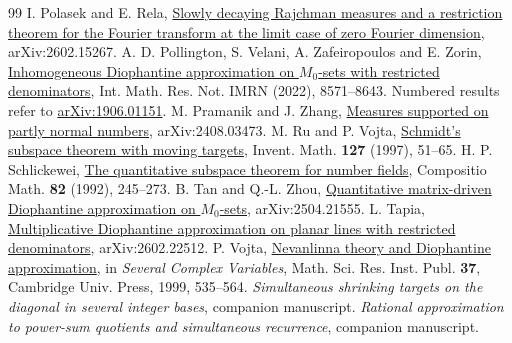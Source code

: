 \documentclass[11pt,a4paper,reqno]{amsart}
\theoremstyle{definition}
\theoremstyle{remark}
\numberwithin{equation}{section}
\begin{document}
\begin{thebibliography}{99}
 I. Polasek and E. Rela, \href{https://arxiv.org/abs/2602.15267}{Slowly decaying Rajchman measures and a restriction theorem for the Fourier transform at the limit case of zero Fourier dimension}, arXiv:2602.15267.
 A. D. Pollington, S. Velani, A. Zafeiropoulos and E. Zorin, \href{https://doi.org/10.1093/imrn/rnaa307}{Inhomogeneous Diophantine approximation on \(M_0\)-sets with restricted denominators}, Int. Math. Res. Not. IMRN (2022), 8571--8643. Numbered results refer to \href{https://arxiv.org/abs/1906.01151}{arXiv:1906.01151}.
 M. Pramanik and J. Zhang, \href{https://arxiv.org/abs/2408.03473}{Measures supported on partly normal numbers}, arXiv:2408.03473.
 M. Ru and P. Vojta, \href{https://doi.org/10.1007/s002220050114}{Schmidt's subspace theorem with moving targets}, Invent. Math. \textbf{127} (1997), 51--65.
 H. P. Schlickewei, \href{https://www.numdam.org/item/CM_1992__82_3_245_0/}{The quantitative subspace theorem for number fields}, Compositio Math. \textbf{82} (1992), 245--273.
 B. Tan and Q.-L. Zhou, \href{https://arxiv.org/abs/2504.21555}{Quantitative matrix-driven Diophantine approximation on \(M_0\)-sets}, arXiv:2504.21555.
 L. Tapia, \href{https://arxiv.org/abs/2602.22512}{Multiplicative Diophantine approximation on planar lines with restricted denominators}, arXiv:2602.22512.
 P. Vojta, \href{https://library.slmath.org/books/Book37/files/vojta.pdf}{Nevanlinna theory and Diophantine approximation}, in \emph{Several Complex Variables}, Math. Sci. Res. Inst. Publ. \textbf{37}, Cambridge Univ. Press, 1999, 535--564.
 \emph{Simultaneous shrinking targets on the diagonal in several integer bases}, companion manuscript.
 \emph{Rational approximation to power-sum quotients and simultaneous recurrence}, companion manuscript.
\end{thebibliography}
\end{document}
